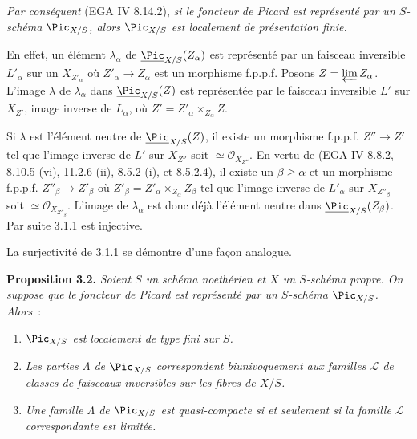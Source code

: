 \emph{Par cons\'equent} (EGA IV 8.14.2), \emph{si le foncteur de Picard est repr\'esent\'e par un \(S\)-sch\'ema \(\Pic_{X/S}\), alors \(\Pic_{X/S}\) est localement de pr\'esentation finie.}

En effet, un \'el\'ement \(\lambda_\alpha\) de \(\underline{\Pic}_{X/S}(Z_\alpha)\) est repr\'esent\'e par un faisceau inversible \(L'_\alpha\) sur un \(X_{Z'_\alpha}\) o\`u \(Z'_\alpha\to Z_\alpha\) est un morphisme f.p.p.f. Posons \(Z=\varprojlim Z_\alpha\). L'image \(\lambda\) de \(\lambda_\alpha\) dans \(\underline{\Pic}_{X/S}(Z)\) est repr\'esent\'ee par le faisceau inversible \(L'\) sur \(X_{Z'}\), image inverse de \(L_\alpha\), o\`u \(Z'=Z'_\alpha\times_{Z_\alpha}Z\).

Si \(\lambda\) est l'\'el\'ement neutre de \(\underline{\Pic}_{X/S}(Z)\), il existe un morphisme f.p.p.f. \(Z''\to Z'\) tel que l'image inverse de \(L'\) sur \(X_{Z''}\) soit \(\simeq\mathcal O_{X_{Z''}}\). En vertu de (EGA IV 8.8.2, 8.10.5 (vi), 11.2.6 (ii), 8.5.2 (i), et 8.5.2.4), il existe un \(\beta\geq\alpha\) et un morphisme f.p.p.f. \(Z''_\beta\to Z'_\beta\) o\`u \(Z'_\beta=Z'_\alpha\times_{Z_\alpha}Z_\beta\) tel que l'image inverse de \(L'_\alpha\) sur \(X_{Z''_\beta}\) soit \(\simeq\mathcal O_{X_{Z''_\beta}}\). L'image de \(\lambda_\alpha\) est donc d\'ej\`a l'\'el\'ement neutre dans \(\underline{\Pic}_{X/S}(Z_\beta)\). Par suite 3.1.1 est injective.

La surjectivit\'e de 3.1.1 se d\'emontre d'une fa\c{c}on analogue.

\textbf{Proposition 3.2.} \emph{Soient \(S\) un sch\'ema noeth\'erien et \(X\) un \(S\)-sch\'ema propre. On suppose que le foncteur de Picard est repr\'esent\'e par un \(S\)-sch\'ema \(\Pic_{X/S}\). Alors}~:
\begin{enumerate}[label=(\roman*)]
\item \emph{\(\Pic_{X/S}\) est localement de type fini sur \(S\).}
\item
\emph{Les parties \(\Lambda\) de \(\Pic_{X/S}\) correspondent biunivoquement aux familles \(\mathscr L\) de classes de faisceaux inversibles sur les fibres de \(X/S\).}
\item \emph{Une famille \(\Lambda\) de \(\Pic_{X/S}\) est quasi-compacte si et seulement si la famille \(\mathscr L\) correspondante est limit\'ee.}
\end{enumerate}

